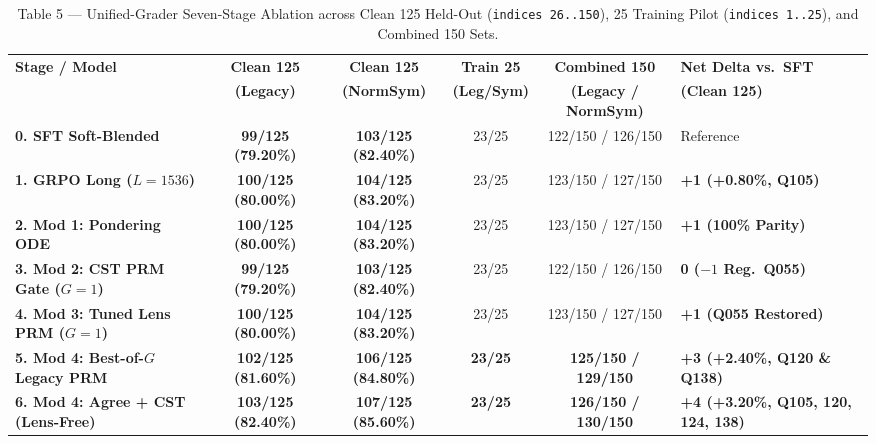 \documentclass[11pt,a4paper]{article}
\begin{document}
\begin{table}[htbp]
\centering
\caption{Table 5 --- Unified-Grader Seven-Stage Ablation across Clean 125 Held-Out (\texttt{indices 26..150}), 25 Training Pilot (\texttt{indices 1..25}), and Combined 150 Sets.}
\label{tab:step3_unified}
\footnotesize
\begin{tabular}{@{}lccccl@{}}
\toprule
\textbf{Stage / Model} & \textbf{Clean 125} & \textbf{Clean 125} & \textbf{Train 25} & \textbf{Combined 150} & \textbf{Net Delta vs.\ SFT} \\
 & \textbf{(Legacy)} & \textbf{(NormSym)} & \textbf{(Leg/Sym)} & \textbf{(Legacy / NormSym)} & \textbf{(Clean 125)} \\
\midrule
\textbf{0. SFT Soft-Blended} & \textbf{99/125 (79.20\%)} & \textbf{103/125 (82.40\%)} & 23/25 & 122/150 / 126/150 & Reference \\
\textbf{1. GRPO Long ($L=1536$)} & \textbf{100/125 (80.00\%)} & \textbf{104/125 (83.20\%)} & 23/25 & 123/150 / 127/150 & \textbf{+1 (+0.80\%, Q105)} \\
\textbf{2. Mod 1: Pondering ODE} & \textbf{100/125 (80.00\%)} & \textbf{104/125 (83.20\%)} & 23/25 & 123/150 / 127/150 & \textbf{+1 (100\% Parity)} \\
\textbf{3. Mod 2: CST PRM Gate ($G=1$)} & \textbf{99/125 (79.20\%)} & \textbf{103/125 (82.40\%)} & 23/25 & 122/150 / 126/150 & \textbf{0 ($-1$ Reg.\ Q055)} \\
\textbf{4. Mod 3: Tuned Lens PRM ($G=1$)} & \textbf{100/125 (80.00\%)} & \textbf{104/125 (83.20\%)} & 23/25 & 123/150 / 127/150 & \textbf{+1 (Q055 Restored)} \\
\textbf{5. Mod 4: Best-of-$G$ Legacy PRM} & \textbf{102/125 (81.60\%)} & \textbf{106/125 (84.80\%)} & \textbf{23/25} & \textbf{125/150 / 129/150} & \textbf{+3 (+2.40\%, Q120 \& Q138)} \\
\textbf{6. Mod 4: Agree + CST (Lens-Free)} & \textbf{103/125 (82.40\%)} & \textbf{107/125 (85.60\%)} & \textbf{23/25} & \textbf{126/150 / 130/150} & \textbf{+4 (+3.20\%, Q105, 120, 124, 138)} \\
\bottomrule
\end{tabular}
\end{table}
\end{document}

